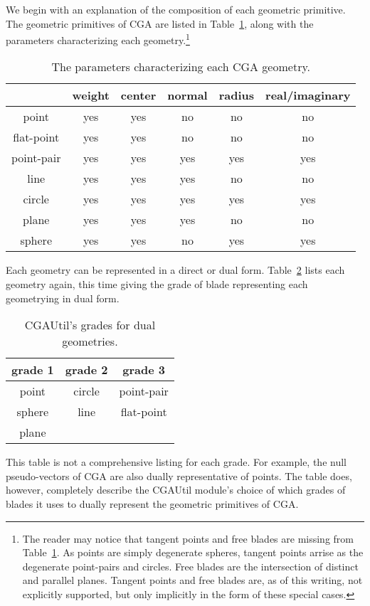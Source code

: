 \documentclass[12pt]{article}
\begin{document}
We begin with an explanation of the composition of each geometric primitive.
The geometric primitives of CGA are listed in Table~\ref{table_geo_char}, along with
the parameters characterizing each geometry.\footnote{The reader may notice
that tangent points and free blades are missing from Table~\ref{table_geo_char}.
As points are simply degenerate spheres, tangent points arrise as the degenerate
point-pairs and circles.  Free blades are the intersection of distinct and parallel planes.
Tangent points and free blades are, as of this writing, not explicitly supported, but only implicitly
in the form of these special cases.}
\begin{table}
\begin{center}
\begin{tabular}{|c|c|c|c|c|c|}
\hline
 & weight & center & normal & radius & real/imaginary \\
\hline
point & yes & yes & no & no & no \\
\hline
flat-point & yes & yes & no & no & no \\
\hline
point-pair & yes & yes & yes & yes & yes \\
\hline
line & yes & yes & yes & no & no \\
\hline
circle & yes & yes & yes & yes & yes \\
\hline
plane & yes & yes & yes & no & no \\
\hline
sphere & yes & yes & no & yes & yes \\
\hline
\end{tabular}
\caption{The parameters characterizing each CGA geometry.}\label{table_geo_char}
\end{center}
\end{table}
Each geometry can be represented in a direct or dual form.
Table~\ref{tab_geo_dual_grades} lists each geometry again, this time giving
the grade of blade representing each geometrying in dual form.
\begin{table}
\begin{center}
\begin{tabular}{|c|c|c|}
\hline
grade 1 & grade 2 & grade 3 \\
\hline
point & circle & point-pair \\
\hline
sphere & line & flat-point \\
\hline
plane & & \\
\hline
\end{tabular}
\caption{CGAUtil's grades for dual geometries.}\label{tab_geo_dual_grades}
\end{center}
\end{table}
This table is not a comprehensive listing for each grade.
For example, the null pseudo-vectors of CGA are also dually
representative of points.  The table does, however, completely
describe the CGAUtil module's choice of which grades of blades it uses
to dually represent the geometric primitives of CGA.
\end{document}
